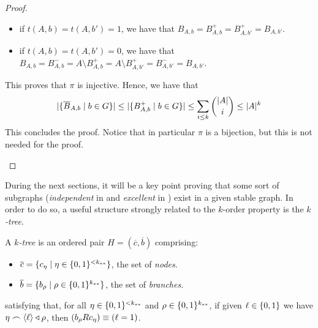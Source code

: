 \begin{corollary}[Claim 2.6.1]
\begin{proof}
\begin{enumerate}
                \begin{itemize}
                    \item if $t(A,b) = t(A,b') = 1$, we have that $B_{A,b} = B^+_{A,b} = B^+_{A,b'} = B_{A,b'}$.
                    \item if $t(A,b) = t(A,b') = 0$, we have that
                    $B_{A,b} = B^-_{A,b} = A \setminus B^+_{A,b} = A \setminus B^+_{A,b'} = B^-_{A,b'} = B_{A,b'}$.
                \end{itemize}
                This proves that $\pi$ is injective.
                Hence, we have that
                \[
                    | \{ \overline{B}_{A,b} \mid b \in G \} | \leq
                    | \{ B^+_{A,b} \mid b \in G \} | \leq
                    \sum_{i \leq k} \binom{|A|}{i} \leq |A|^k
                \]
                This concludes the proof.
                Notice that in particular $\pi$ is a bijection, but this is not needed for the proof.
        \end{enumerate}
        \end{proof}
    \end{corollary}

    During the next sections, it will be a key point proving that some sort of  subgraphs
    (\emph{independent} in  and \emph{excellent} in ) exist in a given
    stable graph.
    In order to do so, a useful structure strongly related to the $k$-order property is the \emph{$k$-tree}.

    \begin{definition} \label{def:k-tree}
        A \emph{$k$-tree} is an ordered pair $H = (\overline{c},\overline{b})$ comprising:
        \begin{itemize}
            \item $\overline{c} = \{  c_\eta \mid \eta \in \{ 0,1 \}^{<k_{**}}  \}$, the set of \emph{nodes}.
            \item $\overline{b} = \{  b_\rho \mid \rho \in \{ 0,1 \}^{k_{**}}  \}$, the set of \emph{branches}.
        \end{itemize}
        satisfying that, for all $\eta \in \{ 0,1 \}^{<k_{**}}$ and $\rho \in \{ 0,1 \}^{k_{**}}$,
        if given $\ell \in \{ 0, 1 \}$ we have $\eta \frown \left< \ell \right> \triangleleft \rho$, then
        $( b_\rho R c_\eta ) \equiv ( \ell = 1 )$.
    \end{definition}

